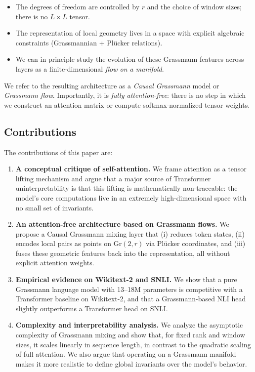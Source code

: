 \documentclass[11pt]{article}
\newcommand{\Gr}{\mathrm{Gr}}
\begin{document}
\begin{itemize}
    \item The degrees of freedom are controlled by $r$ and the choice of window sizes; there is no $L\times L$ tensor.
    \item The representation of local geometry lives in a space with explicit algebraic constraints (Grassmannian + Pl\"ucker relations)\cite{hartshorne1977ag,lee2018riemannian,edelman1998grassmann,absil2008opt}.
    \item We can in principle study the evolution of these Grassmann features across layers as a finite-dimensional \emph{flow on a manifold}.
\end{itemize}

We refer to the resulting architecture as a \emph{Causal Grassmann} model or \emph{Grassmann flow}. Importantly, it is \emph{fully attention-free}: there is no step in which we construct an attention matrix or compute softmax-normalized tensor weights.

\subsection{Contributions}

The contributions of this paper are:

\begin{enumerate}
    \item \textbf{A conceptual critique of self-attention.} We frame attention as a tensor lifting mechanism and argue that a major source of Transformer uninterpretability is that this lifting is mathematically non-traceable: the model's core computations live in an extremely high-dimensional space with no small set of invariants.
    \item \textbf{An attention-free architecture based on Grassmann flows.} We propose a Causal Grassmann mixing layer that (i) reduces token states, (ii) encodes local pairs as points on $\Gr(2,r)$ via Pl\"ucker coordinates, and (iii) fuses these geometric features back into the representation, all without explicit attention weights.
    \item \textbf{Empirical evidence on Wikitext-2 and SNLI.} We show that a pure Grassmann language model with 13--18M parameters is competitive with a Transformer baseline on Wikitext-2, and that a Grassmann-based NLI head slightly outperforms a Transformer head on SNLI.
    \item \textbf{Complexity and interpretability analysis.} We analyze the asymptotic complexity of Grassmann mixing and show that, for fixed rank and window sizes, it scales linearly in sequence length, in contrast to the quadratic scaling of full attention. We also argue that operating on a Grassmann manifold makes it more realistic to define global invariants over the model's behavior.
\end{enumerate}
\end{document}
